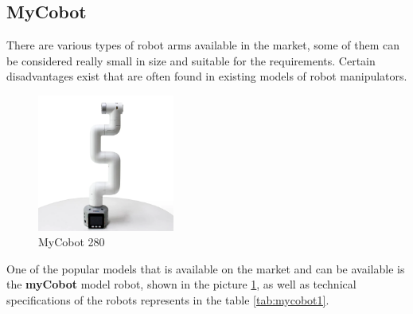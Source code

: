 
\subsection*{MyCobot}
There are various types of robot arms available in the market, some of them can be considered really small in size and suitable for the requirements.
Certain disadvantages exist that are often found in existing models of robot manipulators.


    
    


\begin{figure}[H]
	\centering
	\includegraphics[width=0.4\textwidth]{Src/images/myCobot.png}
	\caption{MyCobot 280}
    \label{fig:mycobot1}
    
\end{figure}
One of the popular models that is available on the market and can be available is the \textbf{myCobot} model robot, shown in the picture \ref*{fig:mycobot1}, as well as technical specifications of the robots represents in the table \ref*{tab:mycobot1}.


